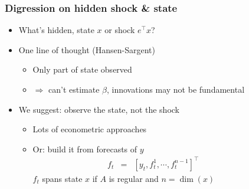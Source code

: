 \documentclass{beamer}
\begin{document}
\begin{frame}
\frametitle{Digression on hidden shock \& state}
\begin{itemize}  \itemsep=\bigskipamount
\item What's hidden, state $x$ or shock $e^\top x$?
\item One line of thought (Hansen-Sargent) \\
\begin{itemize}
\item Only part of state observed
\item $\Rightarrow$ can't estimate $\beta$, innovations may not be fundamental
\end{itemize}
\item We suggest:  observe the state, not the shock  \\
\begin{itemize} \bigskipamount
\item Lots of econometric approaches  \\
\item Or:  build it from forecasts of $y$
\begin{eqnarray*}
    f_t &=& [ y_t, f^1_t, \cdots, f^{n-1}_t ]^\top
            \phantom{xxxxxx}
\end{eqnarray*}
$f_t$ spans state $x$ if $A$ is regular and $n = \dim(x)$
\end{itemize}
\end{itemize}
\end{frame}
\end{document}
